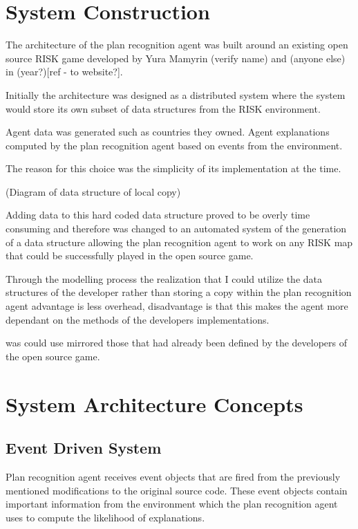 \documentclass[parskip]{cs4rep}
\begin{document}
\section{System Construction}

The architecture of the plan recognition agent was built around an existing open source RISK game developed by Yura Mamyrin (verify name) and (anyone else) in (year?)[ref - to website?].

Initially the architecture was designed as a distributed system where the system would store its own subset of data structures from the RISK environment.

Agent data was generated such as countries they owned.
Agent explanations computed by the plan recognition agent based on events from the environment.

The reason for this choice was the simplicity of its implementation at the time.

(Diagram of data structure of local copy)

Adding data to this hard coded data structure proved to be overly time consuming and therefore was changed to an automated system of the generation of a data structure allowing the plan recognition agent to work on any RISK map that could be successfully played in the open source game.

Through the modelling process the realization that I could utilize the data structures of the developer rather than storing a copy within the plan recognition agent advantage is less overhead, disadvantage is that this makes the agent more dependant on the methods of the developers implementations.

 was could use mirrored those that had already been defined by the developers of the open source game.

\section{System Architecture Concepts}

\subsection{Event Driven System}

Plan recognition agent receives event objects that are fired from the previously mentioned modifications to the original source code. These event objects contain important information from the environment which the plan recognition agent uses to compute the likelihood of explanations.
\end{document}
